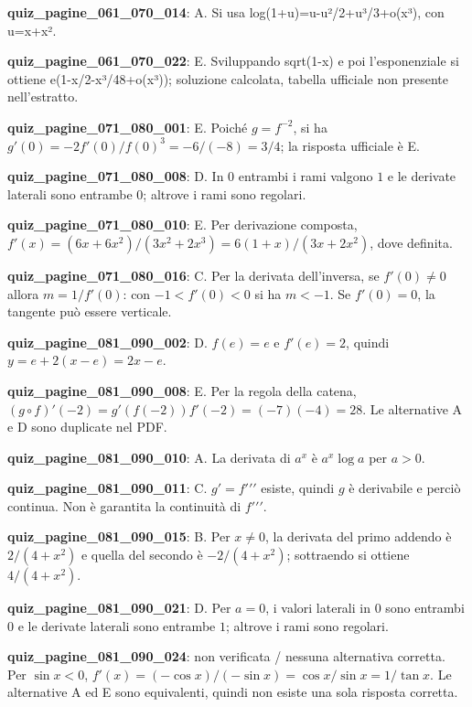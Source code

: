 \documentclass[11pt,a4paper]{article}
\newcounter{quiz}
\begin{document}
\noindent\textbf{quiz\_pagine\_061\_070\_014}: A. Si usa log(1+u)=u-u²/2+u³/3+o(x³), con u=x+x².\par\medskip
\noindent\textbf{quiz\_pagine\_061\_070\_022}: E. Sviluppando sqrt(1-x) e poi l’esponenziale si ottiene e(1-x/2-x³/48+o(x³)); soluzione calcolata, tabella ufficiale non presente nell’estratto.\par\medskip
\noindent\textbf{quiz\_pagine\_071\_080\_001}: E. Poiché $g=f^{-2}$, si ha $g'(0)=-2f'(0)/f(0)^3=-6/(-8)=3/4$; la risposta ufficiale è E.\par\medskip
\noindent\textbf{quiz\_pagine\_071\_080\_008}: D. In $0$ entrambi i rami valgono $1$ e le derivate laterali sono entrambe $0$; altrove i rami sono regolari.\par\medskip
\noindent\textbf{quiz\_pagine\_071\_080\_010}: E. Per derivazione composta, $f'(x)=(6x+6x^2)/(3x^2+2x^3)=6(1+x)/(3x+2x^2)$, dove definita.\par\medskip
\noindent\textbf{quiz\_pagine\_071\_080\_016}: C. Per la derivata dell'inversa, se $f'(0)\ne0$ allora $m=1/f'(0)$: con $-1<f'(0)<0$ si ha $m<-1$. Se $f'(0)=0$, la tangente può essere verticale.\par\medskip
\noindent\textbf{quiz\_pagine\_081\_090\_002}: D. $f(e)=e$ e $f\prime(e)=2$, quindi $y=e+2(x-e)=2x-e$.\par\medskip
\noindent\textbf{quiz\_pagine\_081\_090\_008}: E. Per la regola della catena, $(g\circ f)\prime(-2)=g\prime(f(-2))f\prime(-2)=(-7)(-4)=28$. Le alternative A e D sono duplicate nel PDF.\par\medskip
\noindent\textbf{quiz\_pagine\_081\_090\_010}: A. La derivata di $a^x$ è $a^x\log a$ per $a>0$.\par\medskip
\noindent\textbf{quiz\_pagine\_081\_090\_011}: C. $g\prime=f\prime\prime\prime$ esiste, quindi $g$ è derivabile e perciò continua. Non è garantita la continuità di $f\prime\prime\prime$.\par\medskip
\noindent\textbf{quiz\_pagine\_081\_090\_015}: B. Per $x\neq0$, la derivata del primo addendo è $2/(4+x^2)$ e quella del secondo è $-2/(4+x^2)$; sottraendo si ottiene $4/(4+x^2)$.\par\medskip
\noindent\textbf{quiz\_pagine\_081\_090\_021}: D. Per $a=0$, i valori laterali in $0$ sono entrambi $0$ e le derivate laterali sono entrambe $1$; altrove i rami sono regolari.\par\medskip
\noindent\textbf{quiz\_pagine\_081\_090\_024}: non verificata / nessuna alternativa corretta. Per $\sin x<0$, $f\prime(x)=(-\cos x)/(-\sin x)=\cos x/\sin x=1/\tan x$. Le alternative A ed E sono equivalenti, quindi non esiste una sola risposta corretta.\par\medskip
\end{document}
